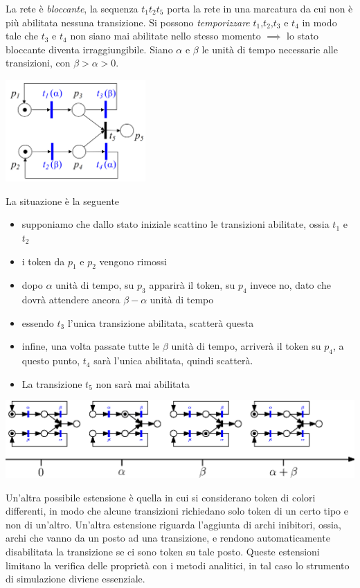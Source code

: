 \documentclass[10pt, letterpaper]{report}
\begin{document}
La rete è \textit{bloccante}, la sequenza $t_1t_2t_5$ porta la rete in una marcatura da cui non è più abilitata nessuna  transizione. Si possono \textit{temporizzare} $t_1$,$t_2$,$t_3$ e $t_4$ in modo tale che $t_3$ e $t_4$ non siano mai abilitate nello stesso momento $\implies$ lo stato bloccante diventa irraggiungibile.
Siano $\alpha$ e $\beta$ le unità di tempo necessarie alle transizioni, con $\beta > \alpha > 0$.\begin{center}
    \includegraphics[width=0.4\textwidth]{images/temporizzata2.png}
\end{center} La situazione è la seguente\begin{itemize}
    \item supponiamo che dallo stato iniziale scattino le transizioni abilitate, ossia $t_1$ e $t_2$
    \item i token da $p_1$ e $p_2$ vengono rimossi 
    \item dopo $\alpha$ unità di tempo, su $p_3$ apparirà il token, su $p_4$ invece no, dato che dovrà attendere ancora $\beta-\alpha$ unità di tempo 
    \item essendo $t_3$ l'unica transizione abilitata, scatterà questa 
    \item infine, una volta passate tutte le $\beta$ unità di tempo, arriverà il token su $p_4$, a questo punto, $t_4$ sarà l'unica abilitata, quindi scatterà. 
    \item La transizione $t_5$ non sarà mai abilitata
\end{itemize}
\begin{center}
    \includegraphics[width=\textwidth]{images/evoluzioneTemporale.eps}
\end{center}
Un'altra possibile estensione è quella in cui si considerano token di colori differenti, in modo che alcune transizioni richiedano solo token di un certo tipo e non di un'altro. \acc 
Un'altra estensione riguarda l'aggiunta di archi inibitori, ossia, archi che vanno da un posto ad una transizione, e rendono automaticamente disabilitata la transizione se ci sono token su tale posto.\acc 
Queste estensioni limitano la verifica delle proprietà con i metodi analitici, in tal caso lo strumento di simulazione diviene essenziale.\flowerLine 
\end{document}
